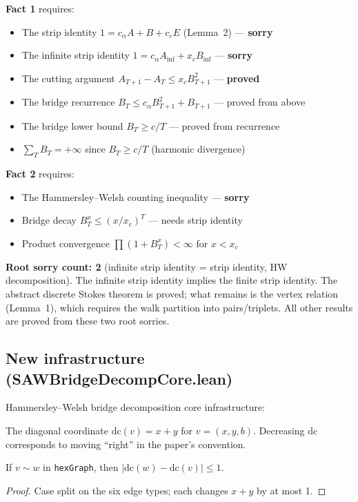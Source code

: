 \begin{lemma}
\textbf{Fact 1} requires:
\begin{itemize}
\item The strip identity $1 = c_\alpha A + B + c_\varepsilon E$ (Lemma~2) --- \textbf{sorry}
\item The infinite strip identity $1 = c_\alpha A_{\inf} + x_c B_{\inf}$ --- \textbf{sorry}
\item The cutting argument $A_{T+1} - A_T \leq x_c B_{T+1}^2$ --- \textbf{proved}
\item The bridge recurrence $B_T \leq c_\alpha B_{T+1}^2 + B_{T+1}$ --- proved from above
\item The bridge lower bound $B_T \geq c/T$ --- proved from recurrence
\item $\sum_T B_T = +\infty$ since $B_T \geq c/T$ (harmonic divergence)
\end{itemize}

\textbf{Fact 2} requires:
\begin{itemize}
\item The Hammersley--Welsh counting inequality --- \textbf{sorry}
\item Bridge decay $B_T^x \leq (x/x_c)^T$ --- needs strip identity
\item Product convergence $\prod(1 + B_T^x) < \infty$ for $x < x_c$
\end{itemize}

\textbf{Root sorry count: 2} (infinite strip identity = strip identity,
HW decomposition). The infinite strip identity implies the finite strip
identity. The abstract discrete Stokes theorem is proved; what remains
is the vertex relation (Lemma~1), which requires the walk partition
into pairs/triplets. All other results are proved from these two root sorries.

\subsection*{New infrastructure (SAWBridgeDecompCore.lean)}

Hammersley--Welsh bridge decomposition core infrastructure:

\begin{definition}\label{def:hex_diag_coord}
\leanok
  The diagonal coordinate $\mathrm{dc}(v) = x + y$ for $v = (x, y, b)$.
  Decreasing $\mathrm{dc}$ corresponds to moving ``right'' in the paper's convention.
\end{definition}

\begin{lemma}\label{lem:hex_dc_adj}
\leanok
{}
  If $v \sim w$ in \texttt{hexGraph}, then $|\mathrm{dc}(w) - \mathrm{dc}(v)| \leq 1$.
\end{lemma}
\begin{proof}\leanok
  Case split on the six edge types; each changes $x+y$ by at most 1.
\end{proof}


\end{lemma}
